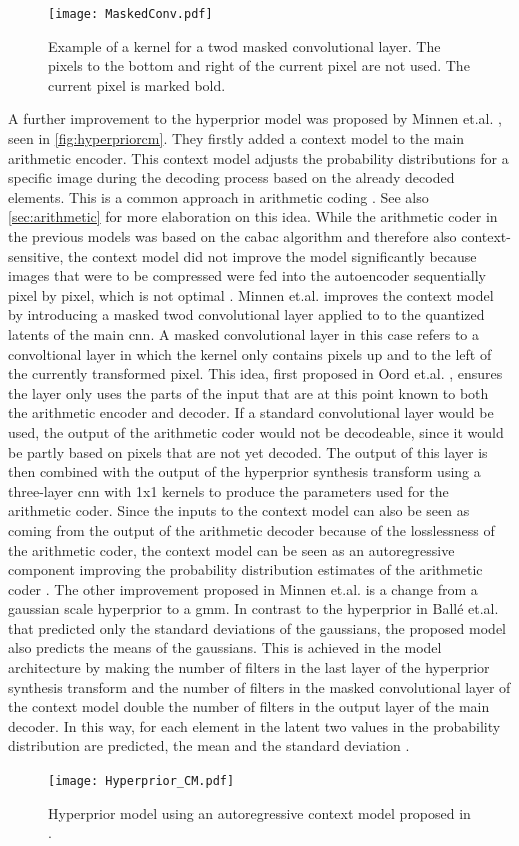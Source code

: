 \begin{figure}
\centering
\texttt{[image: MaskedConv.pdf]}
\caption[Example of masked convolutional layer]{Example of a kernel for a \ac{twod} masked convolutional layer. The pixels to the bottom and right of the current pixel are not used. The current pixel is marked bold.}
\label{fig:maskedconv}
\end{figure}

A further improvement to the hyperprior model was proposed by Minnen et.al. \citep{minnen_joint_2018}, seen in \autoref{fig:hyperpriorcm}. They firstly added a context model to the main arithmetic encoder. This context model adjusts the probability distributions for a specific image during the decoding process based on the already decoded elements. This is a common approach in arithmetic coding \citep{said_introduction_2023}. See also \autoref{sec:arithmetic} for more elaboration on this idea. While the arithmetic coder in the previous models was based on the \ac{cabac} algorithm and therefore also context-sensitive, the context model did not improve the model significantly because images that were to be compressed were fed into the autoencoder sequentially pixel by pixel, which is not optimal \citep{balle_end--end_2017}. Minnen et.al. improves the context model by introducing a masked \ac{twod} convolutional layer applied to to the quantized latents of the main \ac{cnn}. A masked convolutional layer in this case refers to a convoltional layer in which the kernel only contains pixels up and to the left of the currently transformed pixel. This idea, first proposed in Oord et.al. \citep{oord_conditional_2016}, ensures the layer only uses the parts of the input that are at this point known to both the arithmetic encoder and decoder. If a standard convolutional layer would be used, the output of the arithmetic coder would not be decodeable, since it would be partly based on pixels that are not yet decoded.  The output of this layer is then combined with the output of the hyperprior synthesis transform using a three-layer \ac{cnn} with 1x1 kernels to produce the parameters used for the arithmetic coder. Since the inputs to the context model can also be seen as coming from the output of the arithmetic decoder because of the losslessness of the arithmetic coder, the context model can be seen as an autoregressive component improving the probability distribution estimates of the arithmetic coder \citep{minnen_joint_2018}. The other improvement proposed in Minnen et.al. \citep{minnen_joint_2018} is a change from a gaussian scale hyperprior to a \ac{gmm}. In contrast to the hyperprior in Ballé et.al. \citep{balle_variational_2018} that predicted only the standard deviations of the gaussians, the proposed model also predicts the means of the gaussians. This is achieved in the model architecture by making the number of filters in the last layer of the hyperprior synthesis transform and the number of filters in the masked convolutional layer of the context model double the number of filters in the output layer of the main decoder. In this way, for each element in the latent two values in the probability distribution are predicted, the mean and the standard deviation \citep{minnen_joint_2018}.

\begin{figure}
\centering
\texttt{[image: Hyperprior\_CM.pdf]}
\caption[Joint hyperprior architecture]{Hyperprior model using an autoregressive context model proposed in \citep{minnen_joint_2018}.}
\label{fig:hyperpriorcm}
\end{figure}